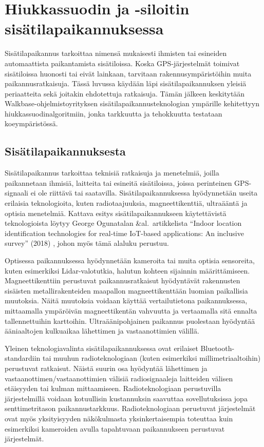 \documentclass[
  12pt,
  a4paper, twoside]{book}
\begin{document}
\chapter{Hiukkassuodin ja -siloitin sisätilapaikannuksessa} \label{paikannusesimerkki}

Sisätilapaikannus tarkoittaa nimensä mukaisesti ihmisten tai esineiden automaattista paikantamista sisätiloissa. Koska GPS-järjestelmät toimivat sisätiloissa huonosti tai eivät lainkaan, tarvitaan rakennusympäristöihin muita paikannusratkaisuja. Tässä luvussa käydään läpi sisätilapaikannuksen yleisiä periaatteita sekä joitakin ehdotettuja ratkaisuja. Tämän jälkeen keskitytään Walkbase-ohjelmistoyrityksen sisätilapaikannusteknologian ympärille kehitettyyn hiukkassuodinalgoritmiin, jonka tarkkuutta ja tehokkuutta testataan koeympäristössä.

\section{Sisätilapaikannuksesta}

Sisätilapaikannus tarkoittaa teknisiä ratkaisuja ja menetelmiä, joilla paikannetaan ihmisiä, laitteita tai esineitä sisätiloissa, joissa perinteinen GPS-signaali ei ole riittävä tai saatavilla. Sisätilapaikannuksessa hyödynnetään useita erilaisia teknologioita, kuten radiotaajuuksia, magneettikenttiä, ultraääntä ja optisia menetelmiä. Kattava esitys sisätilapaikannukseen käytettävistä teknologioista löytyy George Ogunatalan \&al.~artikkelista ``Indoor location identification technologies for real-time IoT-based applications: An inclusive survey'' (2018) \citep{oguntala-2018}, johon myös tämä alaluku perustuu.

Optisessa paikannuksessa hyödynnetään kameroita tai muita optisia sensoreita, kuten esimerkiksi Lidar-valotutkia, halutun kohteen sijainnin määrittämiseen. Magneettikenttiin perustuvat paikannusratkaisut hyödyntävät rakennusten sisäisten metallirakenteiden maapallon magneettikenttään luomian paikallisia muutoksia. Näitä muutoksia voidaan käyttää vertailutietona paikannuksessa, mittaamalla ympäröivän magneettikentän vahvuutta ja vertaamalla sitä ennalta tallennettuihin karttoihin. Ultraäänipohjainen paikannus puolestaan hyödyntää ääniaaltojen kulkuaikaa lähettimen ja vastaanottimien välillä.

Yleinen teknologiavalinta sisätilapaikannuksessa ovat erilaiset Bluetooth-standardiin tai muuhun radioteknologiaan (kuten esimerkiksi millimetriaaltoihin) perustuvat ratkaisut. Näistä suurin osa hyödyntää lähettimen ja vastaanottimen/vastaanottimien välisiä radiosignaaleja laitteiden välisen etäisyyden tai kulman mittaamiseen. Radioteknologiaan perustuvilla järjestelmillä voidaan kotuullisin kustannuksin saavuttaa sovellutuksissa jopa senttimetritason paikannustarkkuus. Radioteknologiaan perustuvat järjestelmät ovat myös yksityisyyden näkökulmasta yksinkertaisempia toteuttaa kuin esimerkiksi kameroiden avulla tapahtuvaan paikannukseen perustuvat järjestelmät.
\end{document}
